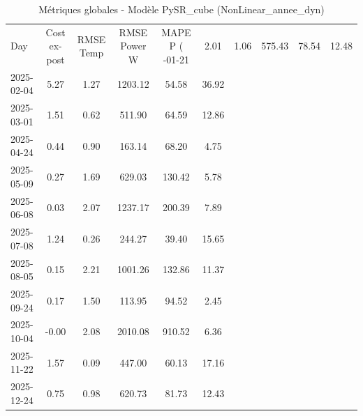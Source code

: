 \begin{table}
\caption{Métriques globales - Modèle PySR_cube (NonLinear_annee_dyn)}
\label{tab:PySR_cube_NonLinear_annee_dyn_Validation_EPlus_sans_Opti}
\begin{small}
\begin{tabular}{lccccc}
\toprule
Day & Cost ex-post & RMSE Temp & RMSE Power W & MAPE P (%
-01-21 & 2.01 & 1.06 & 575.43 & 78.54 & 12.48 \\
2025-02-04 & 5.27 & 1.27 & 1203.12 & 54.58 & 36.92 \\
2025-03-01 & 1.51 & 0.62 & 511.90 & 64.59 & 12.86 \\
2025-04-24 & 0.44 & 0.90 & 163.14 & 68.20 & 4.75 \\
2025-05-09 & 0.27 & 1.69 & 629.03 & 130.42 & 5.78 \\
2025-06-08 & 0.03 & 2.07 & 1237.17 & 200.39 & 7.89 \\
2025-07-08 & 1.24 & 0.26 & 244.27 & 39.40 & 15.65 \\
2025-08-05 & 0.15 & 2.21 & 1001.26 & 132.86 & 11.37 \\
2025-09-24 & 0.17 & 1.50 & 113.95 & 94.52 & 2.45 \\
2025-10-04 & -0.00 & 2.08 & 2010.08 & 910.52 & 6.36 \\
2025-11-22 & 1.57 & 0.09 & 447.00 & 60.13 & 17.16 \\
2025-12-24 & 0.75 & 0.98 & 620.73 & 81.73 & 12.43 \\
\bottomrule
\end{tabular}
\end{small}
\end{table}
